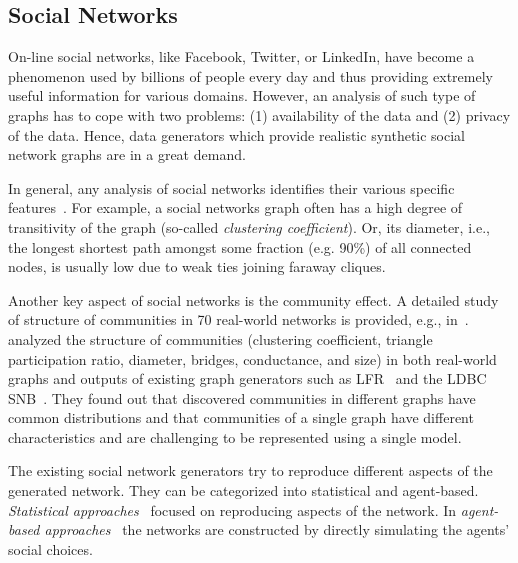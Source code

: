 \subsection{Social Networks}
\label{sec:generators_socialnetworks}

On-line social networks, like Facebook, Twitter, or LinkedIn, have become a
phenomenon used by billions of people every day and thus providing extremely
useful information for various domains. However, an analysis of such type of
graphs has to cope with two problems: (1) availability of the data and (2)
privacy of the data. Hence, data generators which provide realistic synthetic
social network graphs are in a great demand.

In general, any analysis of social networks identifies their various specific
features~\cite{Chakrabarti:2006:GML:1132952.1132954}. For example, a social
networks graph often has a high  degree of
transitivity of the graph (so-called \emph{clustering coefficient}). Or, its diameter, i.e., the longest shortest path
amongst some fraction (e.g. 90\%) of all connected nodes, is usually low due to
weak ties joining faraway cliques.

Another key aspect of social networks is the community effect. A detailed
study of structure of communities in 70 real-world networks is provided, e.g.,
in~\cite{Leskovec:2008:SPC:1367497.1367591}.
~\cite{Prat-Perez:2014:CSS:2621934.2621942} analyzed the structure of
communities (clustering coefficient, triangle participation ratio, 
diameter, bridges, conductance, and size) in both real-world graphs and outputs of
existing graph generators such as LFR~\cite{PhysRevE.78.046110} and the
LDBC SNB~\cite{Erling:2015:LSN:2723372.2742786}. They found out that discovered
communities  in different graphs have common distributions and that communities
of a single graph have different characteristics and are challenging to be represented using a single
model.

The existing social network generators try to reproduce different aspects of the
generated network. They can be categorized into statistical and agent-based.
\emph{Statistical
approaches}~\cite{PhysRevE.78.046110,Yao2011,Armstrong:2013:LDB:2463676.2465296,Pham2013,Sukthankar-SocialInfo2014,Erling:2015:LSN:2723372.2742786,Nettleton2016}
focused on reproducing aspects of the network. In \emph{agent-based
approaches}~\cite{Barrett:2009:GAL:1995456.1995598,Bernstein:2013:SAS:2499604.2499609}
the networks are constructed by directly simulating the agents' social choices.

